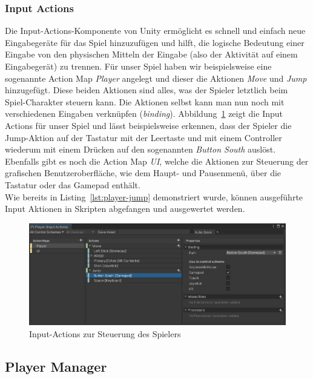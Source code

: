 \subsubsection*{Input Actions}
Die Input-Actions-Komponente von Unity ermöglicht es schnell und einfach neue Eingabegeräte für das Spiel hinzuzufügen und hilft, die logische Bedeutung einer Eingabe von den physischen Mitteln der Eingabe (also der Aktivität auf einem Eingabegerät) zu trennen. Für unser Spiel haben wir beispielsweise eine sogenannte Action Map \textit{Player} angelegt und dieser die Aktionen \textit{Move} und \textit{Jump} hinzugefügt. Diese beiden Aktionen sind alles, was der Spieler letztlich beim Spiel-Charakter steuern kann. Die Aktionen selbst kann man nun noch mit verschiedenen Eingaben verknüpfen (\textit{binding}). Abbildung~\ref{fig:input-actions} zeigt die Input Actions für unser Spiel und lässt beispielsweise erkennen, dass der Spieler die Jump-Aktion auf der Tastatur mit der Leertaste und mit einem Controller wiederum mit einem Drücken auf den sogenannten \textit{Button South} auslöst. Ebenfalls gibt es noch die Action Map \textit{UI}, welche die Aktionen zur Steuerung der grafischen Benutzeroberfläche, wie dem Haupt- und Pausenmenü, über die Tastatur oder das Gamepad enthält.\\

Wie bereits in Listing~\ref{lst:player-jump} demonstriert wurde, können ausgeführte Input Aktionen in Skripten abgefangen und ausgewertet werden.\\

\begin{figure}[th]
\centering
\includegraphics[width=150mm]{Figures/input-actions.jpg}
\decoRule
\caption[Input-Actions zur Steuerung des Spielers]{Input-Actions zur Steuerung des Spielers}
\label{fig:input-actions}
\end{figure}

\subsection{Player Manager}
\label{section: player-manager}

